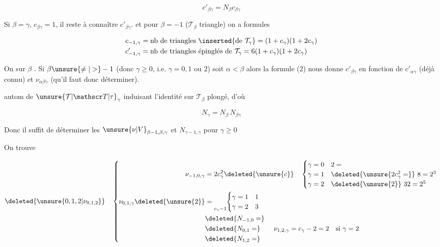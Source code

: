 \[ c'_{\beta\gamma}=N_\beta c_{\beta\gamma} \]

Si $\beta=\gamma$, $c_{\beta\gamma}=1$,  il reste à connaître $c'_{\beta\gamma}$.  et pour $\beta=-1$ ($\mathcal T_\beta$ triangle) on a formules

\[
\begin{aligned}
c_{-1,\gamma}&=\text{nb de triangles }\inserted{\text{de }\mathcal T_\gamma}=(1+c_\gamma)(1+2c_\gamma)\\
c'_{-1,\gamma}&=\text{nb de triangles épinglés de }\mathcal T_\gamma=6(1+c_\gamma)(1+2c_\gamma)
\end{aligned}
\]

On  sur $\beta$ . Si $\beta\unsure{\neq|>}-1$ (donc $\gamma\geq0$, i.e. $\gamma=0,1$ ou $2$) soit $\alpha<\beta$   alors la formule (2) nous donne $c'_{\beta\gamma}$ en fonction de $c'_{\alpha\gamma}$ (déjà connu) et $\nu_{\alpha\beta\gamma}$ (qu'il faut donc déterminer).


autom de $\unsure{\mathcal T|\mathscr T|\tau}_\gamma$ induisant l'identité sur \inserted{$\simeq$} $\mathcal T_\beta$ plongé, d'où

\[ N_\gamma=N_\beta\,N_{\beta\gamma} \]

Donc il suffit de déterminer les  $\unsure{\nu|V}_{\beta-1,\beta,\gamma}$  et $N_{\gamma-1,\gamma}$ pour $\gamma\geq0$

On trouve 

\[
\deleted{\unsure{0,1,2|\nu_{0,1,2}}}\quad
\left\{\begin{aligned}
\nu_{-1,0,\gamma}&=2c_\gamma^2\deleted{\unsure{c}}\quad
\begin{cases}\gamma=0&2=\\ \gamma=1&\deleted{\unsure{2c_\gamma^2=}}\ 8=2^3\\
\gamma=2&\deleted{\unsure{2}}\ 32=2^5\end{cases}\\
\nu_{0,1,\gamma}\deleted{\unsure{2}}&=\underset{c_\gamma-1}{\vphantom{\big|}}\!
\begin{cases}\gamma=1&1\\ \gamma=2&3\end{cases}\\
&\deleted{N_{-1,0}=}\\
&\deleted{N_{0,1}=}\qquad\nu_{1,2,\gamma}=c_\gamma-2=2\quad\text{si }\gamma=2\\
&\deleted{N_{1,2}=}
\end{aligned}\right.
\]

